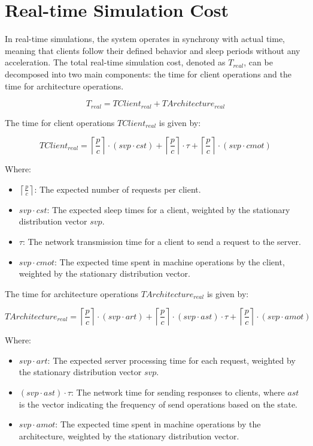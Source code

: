\section{Real-time Simulation Cost}

In real-time simulations, the system operates in synchrony with actual time, meaning that clients follow their defined behavior and sleep periods without any acceleration. The total real-time simulation cost, denoted as \( T_{real} \), can be decomposed into two main components: the time for client operations and the time for architecture operations.

\[
    T_{real} = TClient_{real} + TArchitecture_{real}
\]

The time for client operations \( TClient_{real} \) is given by:

\[
    TClient_{real} = \left\lceil \frac{p}{c} \right\rceil \cdot (svp \cdot cst) + \left\lceil \frac{p}{c} \right\rceil \cdot \tau + \left\lceil \frac{p}{c} \right\rceil \cdot (svp \cdot cmot)
\]

Where:
\begin{itemize}
    \item \( \left\lceil \frac{p}{c} \right\rceil \): The expected number of requests per client.
    \item \( svp \cdot cst \): The expected sleep times for a client, weighted by the stationary distribution vector \( svp \).
    \item \( \tau \): The network transmission time for a client to send a request to the server.
    \item \( svp \cdot cmot \): The expected time spent in machine operations by the client, weighted by the stationary distribution vector.
\end{itemize}

The time for architecture operations \( TArchitecture_{real} \) is given by:

\[
    TArchitecture_{real} = \left\lceil \frac{p}{c} \right\rceil \cdot (svp \cdot art) + \left\lceil \frac{p}{c} \right\rceil \cdot (svp \cdot ast) \cdot \tau + \left\lceil \frac{p}{c} \right\rceil \cdot (svp \cdot amot)
\]

Where:
\begin{itemize}
    \item \( svp \cdot art \): The expected server processing time for each request, weighted by the stationary distribution vector \( svp \).
    \item \( (svp \cdot ast) \cdot \tau \): The network time for sending responses to clients, where \( ast \) is the vector indicating the frequency of send operations based on the state.
    \item \( svp \cdot amot \): The expected time spent in machine operations by the architecture, weighted by the stationary distribution vector.
\end{itemize}

